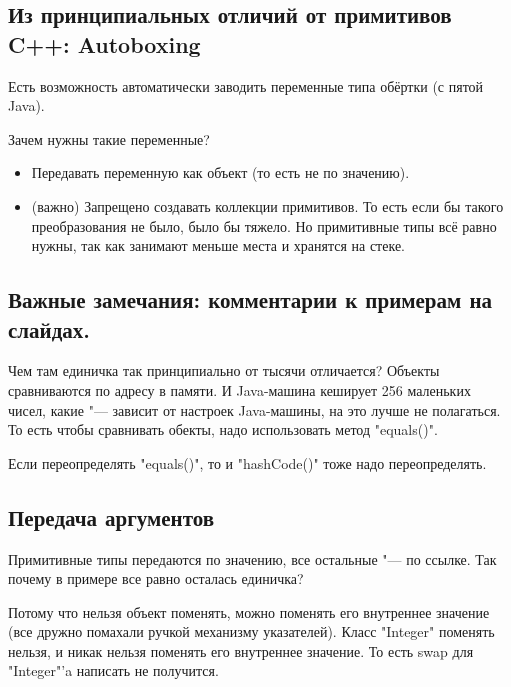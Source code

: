 \subsection{Из принципиальных отличий от примитивов C++: Autoboxing}

Есть возможность автоматически заводить переменные типа обёртки (с пятой Java).

Зачем нужны такие переменные?
\begin{itemize}
\item
	Передавать переменную как объект (то есть не по значению).

\item
	(важно)
	Запрещено создавать коллекции примитивов.
	То есть если бы такого преобразования не было, было бы тяжело.
	Но примитивные типы всё равно нужны, так как занимают меньше места и хранятся на стеке.
\end{itemize}

\subsection{Важные замечания: комментарии к примерам на слайдах.}

Чем там единичка так принципиально от тысячи отличается?
Объекты сравниваются по адресу в памяти.
И Java-машина кеширует 256 маленьких чисел, какие "--- зависит от настроек Java-машины, на это лучше не полагаться.
То есть чтобы сравнивать обекты, надо использовать метод \java"equals()".

Если переопределять \java"equals()", то и \java"hashCode()" тоже надо переопределять.

\subsection{Передача аргументов}

Примитивные типы передаются по значению, все остальные "--- по ссылке.
Так почему в примере все равно осталась единичка?
%
%
%
%
%

Потому что нельзя объект поменять, можно поменять его внутреннее значение (все дружно помахали ручкой механизму указателей).
Класс \java"Integer" поменять нельзя, и никак нельзя поменять его внутреннее значение.
То есть swap для \java"Integer"'a написать не получится. %



